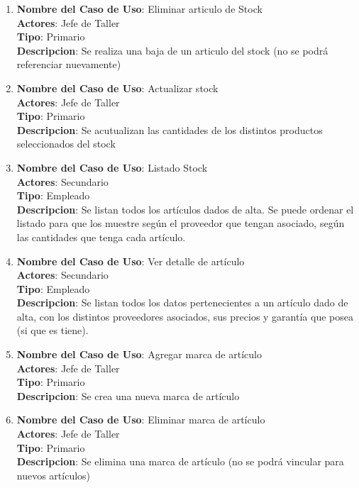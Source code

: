 \documentclass[12pt]{extarticle}
\begin{document}
\begin{spacing}{1.2}
\begin{enumerate}
        \item 	\textbf{Nombre del Caso de Uso}: Eliminar articulo de Stock\\
                \textbf{Actores}: Jefe de Taller\\
                \textbf{Tipo}: Primario\\
                \textbf{Descripcion}: Se realiza una baja de un articulo del stock (no se podrá referenciar nuevamente)

        \item 	\textbf{Nombre del Caso de Uso}: Actualizar stock\\
                \textbf{Actores}: Jefe de Taller\\
                \textbf{Tipo}: Primario\\
                \textbf{Descripcion}: Se acutualizan las cantidades de los distintos productos seleccionados del stock

        \item 	\textbf{Nombre del Caso de Uso}: Listado Stock\\
                \textbf{Actores}: Secundario\\
                \textbf{Tipo}: Empleado\\
                \textbf{Descripcion}: Se listan todos los artículos dados de alta. Se puede ordenar el listado para que los muestre según el proveedor que tengan asociado, según las cantidades que tenga cada artículo. 

        \item 	\textbf{Nombre del Caso de Uso}: Ver detalle de artículo\\
                \textbf{Actores}: Secundario\\
                \textbf{Tipo}: Empleado\\
                \textbf{Descripcion}: Se listan todos los datos pertenecientes a un artículo dado de alta, con los distintos proveedores asociados, sus precios y garantía que posea (si que es tiene).

        \item 	\textbf{Nombre del Caso de Uso}: Agregar marca de artículo\\
                \textbf{Actores}: Jefe de Taller\\
                \textbf{Tipo}: Primario\\
                \textbf{Descripcion}: Se crea una nueva marca de artículo

        \item 	\textbf{Nombre del Caso de Uso}: Eliminar marca de artículo\\
                \textbf{Actores}: Jefe de Taller\\
                \textbf{Tipo}: Primario\\
                \textbf{Descripcion}: Se elimina una marca de artículo (no se podrá vincular para nuevos artículos)


\end{enumerate}
\end{spacing}
\end{document}

